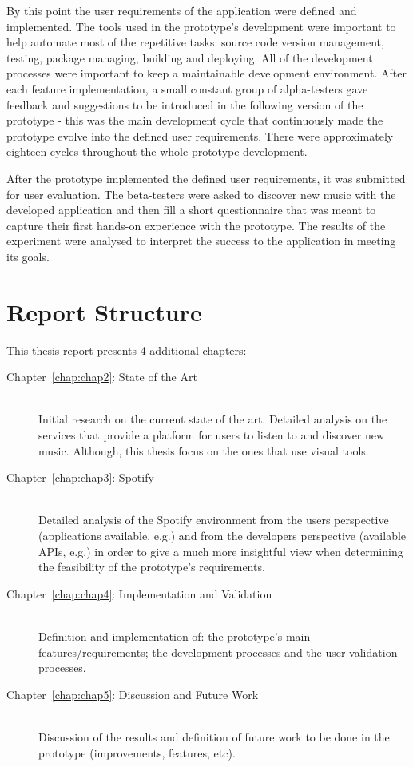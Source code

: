   By this point the user requirements of the application were defined and implemented.
  The tools used in the prototype's development were important to help automate most of the repetitive tasks: source code version management, testing, package managing, building and deploying.
  All of the development processes were important to keep a maintainable development environment.
  After each feature implementation, a small constant group of alpha-testers gave feedback and suggestions to be introduced in the following version of the prototype - this was the main development cycle that continuously made the prototype evolve into the defined user requirements.
  There were approximately eighteen cycles throughout the whole prototype development.

  After the prototype implemented the defined user requirements, it was submitted for user evaluation.
  The beta-testers were asked to discover new music with the developed application and then fill a short questionnaire that was meant to capture their first hands-on experience with the prototype.
  The results of the experiment were analysed to interpret the success to the application in meeting its goals.

\section{Report Structure}
\label{sec:structure}
  
  This thesis report presents 4 additional chapters:

  \begin{description}
    \item[Chapter~\ref{chap:chap2}: State of the Art] \hfill \\
      Initial research on the current state of the art.
      Detailed analysis on the services that provide a platform for users to listen to and discover new music.
      Although, this thesis focus on the ones that use visual tools.
    \item[Chapter~\ref{chap:chap3}: Spotify] \hfill \\
      Detailed analysis of the Spotify environment from the users perspective (applications available, e.g.) and from the developers perspective (available APIs, e.g.) in order to give a much more insightful view when determining the feasibility of the prototype's requirements.
    \item[Chapter~\ref{chap:chap4}: Implementation and Validation] \hfill \\
      Definition and implementation of: the prototype's main features/requirements; the development processes and the user validation processes.
    \item[Chapter~\ref{chap:chap5}: Discussion and Future Work] \hfill \\
      Discussion of the results and definition of future work to be done in the prototype (improvements, features, etc).
  \end{description}
